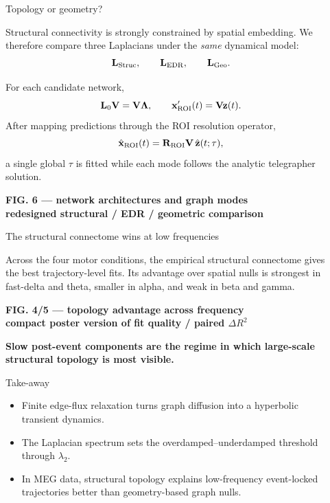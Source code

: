 \documentclass[final]{beamer}
\newcommand{\figureplaceholder}[2]{%
\begin{tcolorbox}[
  colback=blockshade,
  colframe=blockshade,
  boxrule=0pt,
  arc=2mm,
  height=#1,
  valign=center,
  halign=center
]
{\large\bfseries #2}
\end{tcolorbox}
}
\newlength{\sepwidth}
\newlength{\colwidth}
\newcommand{\separatorcolumn}{\begin{column}{\sepwidth}\end{column}}
\begin{document}
\begin{frame}[t]
\begin{columns}[t]
\begin{column}{\colwidth}

\vspace{-6mm}

\begin{block}{Topology or geometry?}
\justifying

Structural connectivity is strongly constrained by spatial embedding. We therefore compare three Laplacians under the \emph{same} dynamical model:
\[
\mathbf{L}_{\rm Struc},
\qquad
\mathbf{L}_{\rm EDR},
\qquad
\mathbf{L}_{\rm Geo}.
\]

For each candidate network,
\[
\mathbf{L}_0\mathbf{V}=\mathbf{V}\boldsymbol{\Lambda},
\qquad
\mathbf{x}'_{\rm ROI}(t)=\mathbf{V}\mathbf{z}(t).
\]
After mapping predictions through the ROI resolution operator,
\[
\hat{\mathbf{x}}_{\rm ROI}(t)
=
\mathbf{R}_{\rm ROI}\mathbf{V}\,
\hat{\mathbf{z}}(t;\tau),
\]
a single global $\tau$ is fitted while each mode follows the analytic telegrapher solution.

\figureplaceholder{19.0cm}{FIG. 6 --- network architectures and graph modes\\[1mm]
\small redesigned structural / EDR / geometric comparison}
\end{block}

\begin{block}{The structural connectome wins at low frequencies}
\justifying

Across the four motor conditions, the empirical structural connectome gives the best trajectory-level fits. Its advantage over spatial nulls is strongest in fast-delta and theta, smaller in alpha, and weak in beta and gamma.

\vspace{1mm}
\figureplaceholder{25.0cm}{FIG. 4/5 --- topology advantage across frequency\\[1mm]
\small compact poster version of fit quality / paired $\Delta R^2$}

\begin{center}
\textbf{Slow post-event components are the regime in which large-scale structural topology is most visible.}
\end{center}
\end{block}

\begin{block}{Take-away}
\begin{itemize}
    \item Finite edge-flux relaxation turns graph diffusion into a hyperbolic transient dynamics.
    \item The Laplacian spectrum sets the overdamped--underdamped threshold through $\lambda_2$.
    \item In MEG data, structural topology explains low-frequency event-locked trajectories better than geometry-based graph nulls.
\end{itemize}
\end{block}

\end{column}

\separatorcolumn
\end{columns}

\end{frame}
\end{document}
